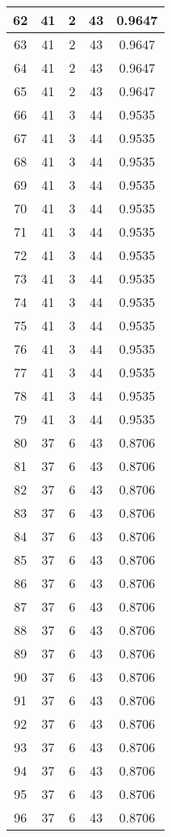 \documentclass[letterpaper, 12pt]{article}
\begin{document}
\begin{longtable}{|c|c|c|c|c|}
\hline
62 & 41 & 2 & 43 & 0.9647 \\
\hline
63 & 41 & 2 & 43 & 0.9647 \\
\hline
64 & 41 & 2 & 43 & 0.9647 \\
\hline
65 & 41 & 2 & 43 & 0.9647 \\
\hline
66 & 41 & 3 & 44 & 0.9535 \\
\hline
67 & 41 & 3 & 44 & 0.9535 \\
\hline
68 & 41 & 3 & 44 & 0.9535 \\
\hline
69 & 41 & 3 & 44 & 0.9535 \\
\hline
70 & 41 & 3 & 44 & 0.9535 \\
\hline
71 & 41 & 3 & 44 & 0.9535 \\
\hline
72 & 41 & 3 & 44 & 0.9535 \\
\hline
73 & 41 & 3 & 44 & 0.9535 \\
\hline
74 & 41 & 3 & 44 & 0.9535 \\
\hline
75 & 41 & 3 & 44 & 0.9535 \\
\hline
76 & 41 & 3 & 44 & 0.9535 \\
\hline
77 & 41 & 3 & 44 & 0.9535 \\
\hline
78 & 41 & 3 & 44 & 0.9535 \\
\hline
79 & 41 & 3 & 44 & 0.9535 \\
\hline
80 & 37 & 6 & 43 & 0.8706 \\
\hline
81 & 37 & 6 & 43 & 0.8706 \\
\hline
82 & 37 & 6 & 43 & 0.8706 \\
\hline
83 & 37 & 6 & 43 & 0.8706 \\
\hline
84 & 37 & 6 & 43 & 0.8706 \\
\hline
85 & 37 & 6 & 43 & 0.8706 \\
\hline
86 & 37 & 6 & 43 & 0.8706 \\
\hline
87 & 37 & 6 & 43 & 0.8706 \\
\hline
88 & 37 & 6 & 43 & 0.8706 \\
\hline
89 & 37 & 6 & 43 & 0.8706 \\
\hline
90 & 37 & 6 & 43 & 0.8706 \\
\hline
91 & 37 & 6 & 43 & 0.8706 \\
\hline
92 & 37 & 6 & 43 & 0.8706 \\
\hline
93 & 37 & 6 & 43 & 0.8706 \\
\hline
94 & 37 & 6 & 43 & 0.8706 \\
\hline
95 & 37 & 6 & 43 & 0.8706 \\
\hline
96 & 37 & 6 & 43 & 0.8706 \\

\end{longtable}
\end{document}
